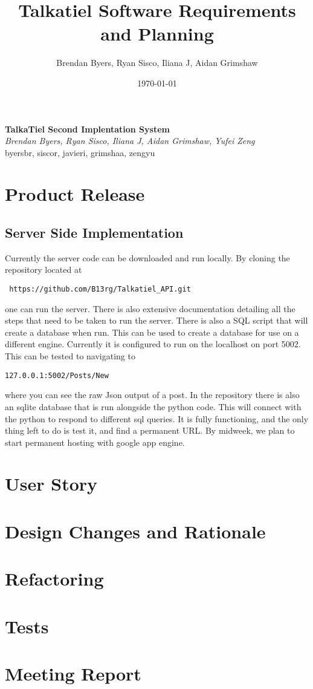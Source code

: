 \documentclass[12pt]{article}
\title{Talkatiel Software Requirements and Planning}
\author{Brendan Byers, Ryan Sisco, Iliana J, Aidan Grimshaw}
\date{\today}
\begin{document}
\begin{center}
      \Large\textbf{TalkaTiel Second Implentation System}\\
      \large\textit{Brendan Byers, Ryan Sisco, Iliana J, Aidan Grimshaw, Yufei Zeng}\\
      \large{byersbr, siscor, javieri, grimshaa, zengyu}\\
   \end{center}

\tableofcontents

\section{Product Release}
\subsection{Server Side Implementation} Currently the server code can be
downloaded and run locally.  By cloning the repository located
at\begin{verbatim} https://github.com/B13rg/Talkatiel_API.git \end{verbatim}one
can run the server.  There is also extensive documentation detailing all the
steps that need to be taken to run the server.  There is also a SQL script that
will create a database when run.  This can be used to create a database for use
on a different engine.  Currently it is configured to run on the localhost on
port 5002.  This can be tested to navigating to
\begin{verbatim}127.0.0.1:5002/Posts/New \end{verbatim}where you can see the raw
Json output of a post.  In the repository there is also an sqlite database that
is run alongside the python code.  This will connect with the python to respond
to different sql queries.  It is fully functioning, and the only thing left to
do is test it, and find a permanent URL. By midweek, we plan to start permanent
hosting with google app engine.

\section{User Story}

\section{Design Changes and Rationale}

\section{Refactoring}

\section{Tests}

\section{Meeting Report}
\end{document}
